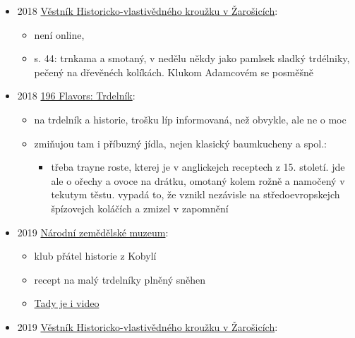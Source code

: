\begin{itemize}
  \begin{itemize}
  \tightlist
  \item
    článek Imoly Katalin Nagy
  \item
    věnuje se historii slova Kürtőskalács a jestli patří Rumunům nebo
    Maďarům
  \item
    s. 75 vypisuje názvy v různejch jazycích - Baumkuchen, staroněmecky
    Ayrkuchen nebo Spiesskuchen, rakousko Prügeltorte, latinsky Obelias
  \end{itemize}
\item
  2018
  \href{https://ceskadigitalniknihovna.cz/uuid/uuid:3f2c7e80-38fe-11e9-b81e-005056827e52}{Věstník
  Historicko-vlastivědného kroužku v Žarošicích}:

  \begin{itemize}
  \tightlist
  \item
    není online, 
  \item
    s. 44: trnkama a smotaný, v nedělu někdy jako pamlsek sladký
    trdélniky, pečený na dřevěnéch kolíkách. Klukom Adamcovém se
    posměšně
  \end{itemize}
\item
  2018 \href{https://www.196flavors.com/trdelnik/}{196 Flavors:
  Trdelník}:

  \begin{itemize}
  \tightlist
  \item
     na trdelník a historie, trošku líp informovaná,
    než obvykle, ale ne o moc
  \item
    zmiňujou tam i příbuzný jídla, nejen klasický baumkucheny a spol.:

    \begin{itemize}
    \tightlist
    \item
      třeba trayne roste, kterej je v anglickejch receptech z 15.
      století. jde ale o ořechy a ovoce na drátku, omotaný kolem rožně a
      namočený v tekutym těstu. vypadá to, že vznikl nezávisle na
      středoevropskejch špízovejch koláčích a zmizel v zapomnění
    \end{itemize}
  \end{itemize}
\item
  2019
  \href{https://www.nzm.cz/o-nas/aktuality/teticky-z-kobyli}{Národní
  zemědělské muzeum}:

  \begin{itemize}
  \tightlist
  \item
    klub přátel historie z Kobylí
  \item
    recept na malý trdelníky plněný sněhen
  \item
    \href{https://www.ceskatelevize.cz/porady/13889655314-peceni-na-nedeli/13478-recepty/12089-trdelnicky-z-kobyli/}{Tady
    je i video}
  \end{itemize}
\item
  2019
  \href{https://ceskadigitalniknihovna.cz/uuid/uuid:771c80e0-53ee-11ea-a3ba-005056827e52}{Věstník
  Historicko-vlastivědného kroužku v Žarošicích}:


\end{itemize}

